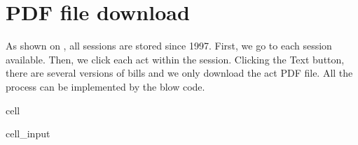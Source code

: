 \documentclass[letterpaper,10pt,english]{jupyterBook}
\begin{document}
\section{PDF file download}
\label{\detokenize{ch21:pdf-file-download}}
\sphinxAtStartPar
As shown on , all sessions are stored since 1997. First, we go to each session available. Then, we click each act within the session. Clicking the Text button, there are several versions of bills and we only download the act PDF file. All the process can be implemented by the blow code.

\begin{sphinxuseclass}{cell}\begin{sphinxVerbatimInput}

\begin{sphinxuseclass}{cell_input}
\begin{sphinxVerbatim}[commandchars=\\\{\}]


\end{sphinxVerbatim}
\end{sphinxuseclass}
\end{sphinxVerbatimInput}
\end{sphinxuseclass}
\end{document}

